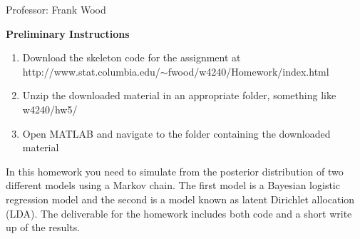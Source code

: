 \documentclass[12pt]{article}
\begin{document}

\begin{center}
	Professor: Frank Wood
\end{center}


{\bf Preliminary Instructions}

\begin{enumerate}
	\item Download the skeleton code for the assignment at \\  http://www.stat.columbia.edu/$\sim$fwood/w4240/Homework/index.html
	\item Unzip the downloaded material in an appropriate folder, something like w4240/hw5/
	\item Open MATLAB and navigate to the folder containing the downloaded material
\end{enumerate}

In this homework you need to simulate from the posterior distribution of two different models using a Markov chain.  The first model is a Bayesian logistic regression model and the second is a model known as latent Dirichlet allocation (LDA).  The deliverable for the homework includes both code and a short write up of the results.\\
\end{document}
